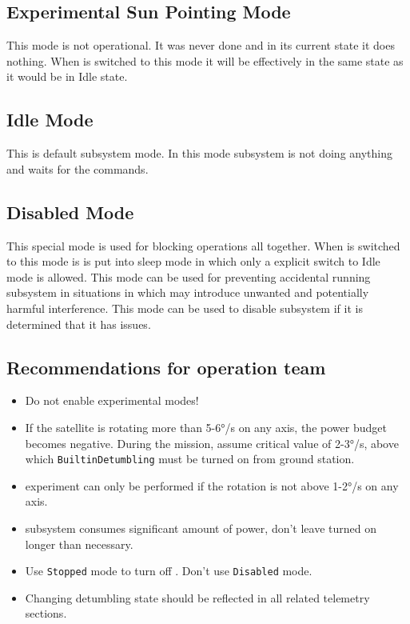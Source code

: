 \subsection{Experimental Sun Pointing Mode}


This mode is not operational. It was never done and in its current state it does nothing. 
When \Adcs is switched to this mode it will be effectively in the same state as it would 
be in Idle state.  

\subsection{Idle Mode}

This is default \Adcs subsystem mode. In this mode \Adcs subsystem is not 
doing anything and waits for the commands. 

\subsection{Disabled Mode}

This special mode is used for blocking \Adcs operations all together. When 
\Adcs is switched to this mode is is put into sleep mode in which only a
explicit switch to Idle mode is allowed. This mode can be used for preventing
accidental running \Adcs subsystem in situations in which \Adcs may introduce 
unwanted and potentially harmful interference. This mode can be used to disable 
\Adcs subsystem if it is determined that it has issues. 

\subsection{Recommendations for operation team}
\begin{itemize}
    \item Do not enable experimental modes!
    \item If the satellite is rotating more than 5-6°/s on any axis, the power budget becomes negative. 
    During the mission, assume critical value of 2-3°/s, above which \texttt{BuiltinDetumbling} must be 
    turned on from ground station.
    \item \sads experiment can only be performed if the rotation is not above 1-2°/s on any axis.    
    \item \Adcs subsystem consumes significant amount of power, don't leave turned on longer than necessary.
    \item Use \texttt{Stopped} mode to turn off \Adcs. Don't use \texttt{Disabled} mode.
    \item Changing detumbling state should be reflected in all \Imtq related telemetry sections.
\end{itemize}

